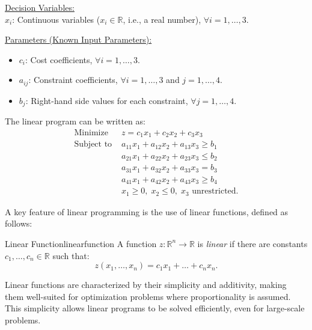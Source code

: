 \medskip \underline{Decision Variables:}\\
$x_i$: Continuous variables ($x_i \in \mathbb{R}$, i.e., a real number), $\forall i = 1,\dots,3$.

\medskip \underline{Parameters (Known Input Parameters):}\\
\begin{itemize}
    \item $c_i$: Cost coefficients, $\forall i = 1,\dots,3$.
    \item $a_{ij}$: Constraint coefficients, $\forall i = 1,\dots,3$ and $j = 1,\dots,4$.
    \item $b_j$: Right-hand side values for each constraint, $\forall j = 1,\dots,4$.
\end{itemize}

The linear program can be written as:
\begin{align}
\text{Minimize } & z = c_1x_1 + c_2x_2 + c_3x_3 \label{eq:OF1} \\
\text{Subject to } & a_{11}x_1 + a_{12}x_2 + a_{13}x_3 \geq b_1 \label{eq:C1} \\
& a_{21}x_1 + a_{22}x_2 + a_{23}x_3 \leq b_2 \label{eq:C2} \\
& a_{31}x_1 + a_{32}x_2 + a_{33}x_3 = b_3 \label{eq:C3} \\
& a_{41}x_1 + a_{42}x_2 + a_{43}x_3 \geq b_4 \label{eq:C4} \\
& x_1 \geq 0, \; x_2 \leq 0, \; x_3 \text{ unrestricted.} \label{eq:C5}
\end{align}



A key feature of linear programming is the use of linear functions, defined as follows:

\begin{definition}{Linear Function}{linearfunction}
A function $z: \mathbb{R}^n \rightarrow \mathbb{R}$ is \textit{linear} if there are constants $c_1, \dots, c_n \in \mathbb{R}$ such that:
\begin{equation}
z(x_1, \dots, x_n) = c_1x_1 + \dots + c_nx_n.
\end{equation}
\label{def:LinearFunc}
\end{definition}

Linear functions are characterized by their simplicity and additivity, making them well-suited for optimization problems where proportionality is assumed. This simplicity allows linear programs to be solved efficiently, even for large-scale problems.






